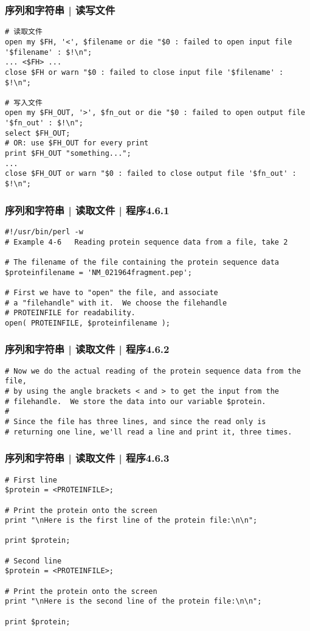 \begin{frame}[fragile]
  \frametitle{序列和字符串 | \alert{读写文件}}
\begin{lstlisting}[basicstyle=\small\tt]
# 读取文件
open my $FH, '<', $filename or die "$0 : failed to open input file '$filename' : $!\n";
... <$FH> ...
close $FH or warn "$0 : failed to close input file '$filename' : $!\n";

# 写入文件
open my $FH_OUT, '>', $fn_out or die "$0 : failed to open output file '$fn_out' : $!\n";
select $FH_OUT;
# OR: use $FH_OUT for every print
print $FH_OUT "something...";
... 
close $FH_OUT or warn "$0 : failed to close output file '$fn_out' : $!\n";
\end{lstlisting}
\end{frame}

\begin{frame}[fragile]
  \frametitle{序列和字符串 | 读取文件 | 程序4.6.1}
\begin{lstlisting}
#!/usr/bin/perl -w
# Example 4-6   Reading protein sequence data from a file, take 2

# The filename of the file containing the protein sequence data
$proteinfilename = 'NM_021964fragment.pep';

# First we have to "open" the file, and associate
# a "filehandle" with it.  We choose the filehandle
# PROTEINFILE for readability.
open( PROTEINFILE, $proteinfilename );
\end{lstlisting}
\end{frame}

\begin{frame}[fragile]
  \frametitle{序列和字符串 | 读取文件 | 程序4.6.2}
\begin{lstlisting}[firstnumber=12]
# Now we do the actual reading of the protein sequence data from the file,
# by using the angle brackets < and > to get the input from the
# filehandle.  We store the data into our variable $protein.
#
# Since the file has three lines, and since the read only is
# returning one line, we'll read a line and print it, three times.
\end{lstlisting}
\end{frame}

\begin{frame}[fragile]
  \frametitle{序列和字符串 | 读取文件 | 程序4.6.3}
\begin{lstlisting}[firstnumber=19,basicstyle=\small\tt]
# First line
$protein = <PROTEINFILE>;

# Print the protein onto the screen
print "\nHere is the first line of the protein file:\n\n";

print $protein;

# Second line
$protein = <PROTEINFILE>;

# Print the protein onto the screen
print "\nHere is the second line of the protein file:\n\n";

print $protein;
\end{lstlisting}
\end{frame}

